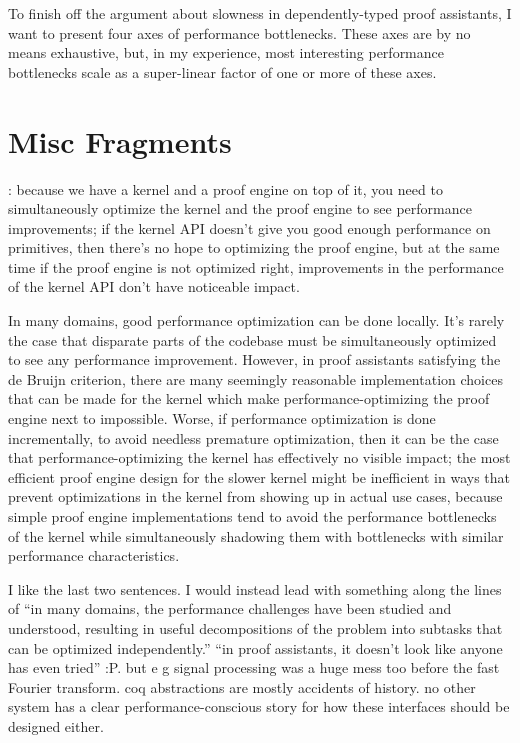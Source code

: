 
To finish off the argument about slowness in dependently-typed proof assistants, I want to present four axes of performance bottlenecks.
These axes are by no means exhaustive, but, in my experience, most interesting performance bottlenecks scale as a super-linear factor of one or more of these axes.

\section*{Misc Fragments}
:  because we have a kernel and a proof engine on top of it, you need to simultaneously optimize the kernel and the proof engine to see performance improvements; if the kernel API doesn't give you good enough performance on primitives, then there's no hope to optimizing the proof engine, but at the same time if the proof engine is not optimized right, improvements in the performance of the kernel API don't have noticeable impact.

In many domains, good performance optimization can be done locally.
It's rarely the case that disparate parts of the codebase must be simultaneously optimized to see any performance improvement.
However, in proof assistants satisfying the de Bruijn criterion, there are many seemingly reasonable implementation choices that can be made for the kernel which make performance-optimizing the proof engine next to impossible.
Worse, if performance optimization is done incrementally, to avoid needless premature optimization, then it can be the case that performance-optimizing the kernel has effectively no visible impact; the most efficient proof engine design for the slower kernel might be inefficient in ways that prevent optimizations in the kernel from showing up in actual use cases, because simple proof engine implementations tend to avoid the performance bottlenecks of the kernel while simultaneously shadowing them with bottlenecks with similar performance characteristics.

I like the last two sentences.
I would instead lead with something along the lines of ``in many domains, the performance challenges have been studied and understood, resulting in useful decompositions of the problem into subtasks that can be optimized independently.''
``in proof assistants, it doesn't look like anyone has even tried'' :P.
but e g signal processing was a huge mess too before the fast Fourier transform.
coq abstractions are mostly accidents of history.
no other system has a clear performance-conscious story for how these interfaces should be designed either.


